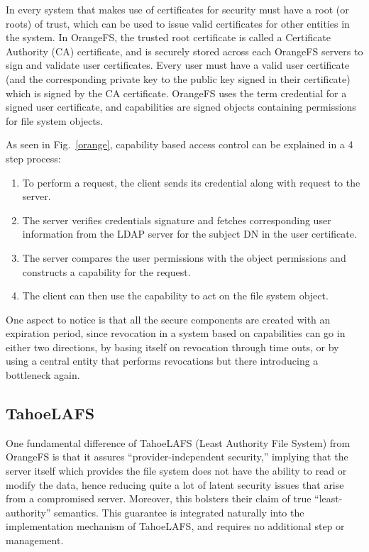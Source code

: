 In every system that makes use of certificates for security must have a root (or roots) of trust, which can be used to issue valid certificates for other entities in the system. In OrangeFS, the trusted root certificate is called a Certificate Authority (CA) certificate, and is securely stored across each OrangeFS servers to sign and validate user certificates. Every user must have a valid user certificate (and the corresponding private key to the public key signed in their certificate) which is signed by the CA certificate. OrangeFS uses the term credential for a signed user certificate, and capabilities are signed objects containing permissions for file system objects.

As seen in Fig.~\ref{orange}, capability based access control can be explained in a 4 step process:
\begin{enumerate}
\item To perform a request, the client sends its credential along with request to the server.
\item The server verifies credentials signature and fetches corresponding user information from the LDAP server for the subject DN in the user certificate. 
\item The server compares the user permissions with the object permissions and constructs a capability for the request.
\item The client can then use the capability to act on the file system object.
\end{enumerate}
One aspect to notice is that all the secure components are created with an expiration period, since revocation in a system based on capabilities can go in either two directions, by basing itself on revocation through time outs, or by using a central entity that performs revocations but there introducing a bottleneck again.

\subsection{TahoeLAFS}
One fundamental difference of TahoeLAFS (Least Authority File System) from OrangeFS is that it assures ``provider-independent security,'' implying that the server itself which provides the file system does not have the ability to read or modify the data, hence reducing quite a lot of latent security issues that arise from a compromised server. Moreover, this bolsters their claim of true ``least-authority'' semantics. This guarantee is integrated naturally into the implementation mechanism of TahoeLAFS, and requires no additional step or management. 

